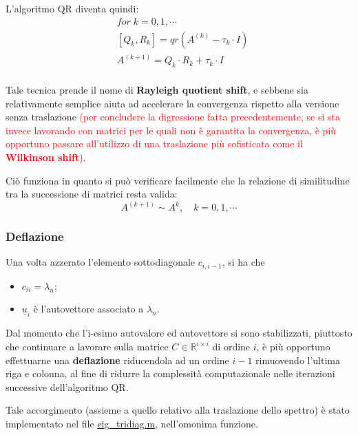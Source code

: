 L'algoritmo QR diventa quindi:
\begin{align*}
&for \; k=0,1,\cdots \\
&	[Q_k, R_k] = qr(A^{(k)} - \tau_k \cdot I) \\
&	A^{(k+1)} = Q_k \cdot R_k + \tau_k \cdot I \\
\end{align*}

Tale tecnica prende il nome di \textbf{Rayleigh quotient shift}, e sebbene sia 
relativamente semplice aiuta ad accelerare la convergenza rispetto alla versione 
senza traslazione \textcolor{red}{(per concludere la digressione fatta 
precedentemente, se si sta invece lavorando con matrici per le quali non è 
garantita la convergenza, è più opportuno passare all'utilizzo di una 
traslazione più sofisticata come il \textbf{Wilkinson shift})}.

Ciò funziona in quanto si può verificare facilmente che la relazione di 
similitudine tra la successione di matrici resta valida:
\begin{equation*}
	A^{(k+1)} \sim A ^{k}, \quad k=0,1,\cdots
\end{equation*}

\subsubsection{Deflazione}
Una volta azzerato l'elemento sottodiagonale $c_{i,i-1}$, si ha che
\begin{itemize}
	\item $c_{ii} = \lambda_n$;
	\item $\underline{u}_i$ è l'autovettore associato a $\lambda_n$.
\end{itemize}

Dal momento che l'i-esimo autovalore ed autovettore si sono stabilizzati, 
piuttosto che continuare a lavorare sulla matrice $C \in \mathbb{R}^{i \times 
i}$ di ordine $i$, è più opportuno effettuarne una \textbf{deflazione} 
riducendola ad un ordine $i-1$ rimuovendo l'ultima riga e colonna, al fine di 
ridurre la complessità computazionale nelle iterazioni successive dell'algoritmo 
QR.

Tale accorgimento (assieme a quello relativo alla traslazione dello spettro) è 
stato implementato nel file 
\href{https://github.com/Yagotzirck/svd_benchmark/blob/main/src/eig_tridiag.m}{eig\_tridiag.m}, 
nell'omonima funzione.
